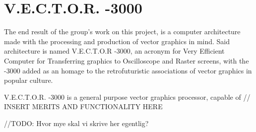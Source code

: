 \chapter{V.E.C.T.O.R. -3000}

The end result of the group's work on this project, is a computer architecture made with the processing and production of vector graphics in mind.
Said architecture is named V.E.C.T.O.R -3000, an acronym for Very Efficient Computer for Transferring graphics to Oscilloscope and Raster screens, with the -3000 added as an homage to the retrofuturistic associations of vector graphics in popular culture.

V.E.C.T.O.R. -3000 is a general purpose vector graphics processor, capable of // INSERT MERITS AND FUNCTIONALITY HERE

//TODO: Hvor mye skal vi skrive her egentlig?
